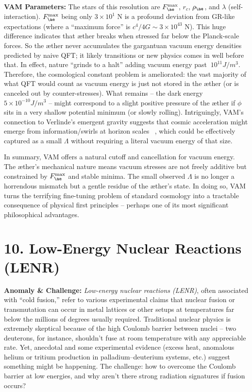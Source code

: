\documentclass[a4paper, aps,preprint,superscriptaddress, 12pt]{revtex4}
\begin{document}
\textbf{VAM Parameters:} The stars of this resolution are $F_{\ae}^{\max}$, $r_c$, $\rho_{\ae}$, and $\lambda$ (self-interaction). $F_{\ae}^{\max}$ being only $3\times10^1$ N is a profound deviation from GR-like expectations (where a “maximum force” is $c^4/4G \sim 3\times10^{43}$ N). This huge difference indicates that æther breaks when stressed far below the Planck-scale forces. So the æther never accumulates the gargantuan vacuum energy densities predicted by naive QFT; it likely transitions or new physics comes in well before that. In effect, nature “grinds to a halt” adding vacuum energy past $~10^11 J/m^3$. Therefore, the cosmological constant problem is ameliorated: the vast majority of what QFT would count as vacuum energy is just not stored in the æther (or is canceled out by counter-stresses). What remains – the dark energy ~ $5\times10^{-10} J/m^3$ – might correspond to a slight positive pressure of the æther if $\phi$ sits in a very shallow potential minimum (or slowly rolling). Intriguingly, VAM’s connection to Verlinde’s emergent gravity suggests that cosmic acceleration might emerge from information/swirls at horizon scales~\cite{Iskandarani2025c} , which could be effectively captured as a small $\Lambda$ without requiring a literal vacuum energy of that size.


In summary, VAM offers a natural cutoff and cancellation for vacuum energy. The æther’s mechanical nature means vacuum stresses are not freely additive but constrained by $F_{\ae}^{\max}$ and stable minima. The small observed $\Lambda$ is no longer a horrendous mismatch but a gentle residue of the æther’s state. In doing so, VAM turns the terrifying fine-tuning problem of standard cosmology into a tractable consequence of physical first principles – perhaps one of its most significant philosophical advantages.


\section*{10. Low-Energy Nuclear Reactions (LENR)}

\textbf{Anomaly \& Challenge: } \textit{Low-energy nuclear reactions (LENR)}, often associated with “cold fusion,” refer to various experimental claims that nuclear fusion or transmutation can occur in metal lattices or other setups at temperatures far below the millions of degrees usually required. Traditional nuclear physics is extremely skeptical because of the high Coulomb barrier between nuclei – two deuterons, for instance, shouldn’t fuse at room temperature with any appreciable rate. Yet, anecdotal and some experimental evidence (excess heat, anomalous helium or tritium production in palladium–deuterium systems, etc.) suggest something might be happening. The challenge: how to overcome the Coulomb barrier at low energies, and why aren’t there strong radiation signatures if fusion occurs?
\end{document}
